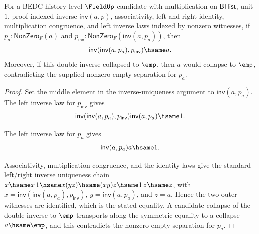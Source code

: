 \begin{theorem}
\label{thm:field-inverse-involutive-nonzero-from-apartness}
For a BEDC history-level $\FieldUp$ candidate with multiplication on
$\mathsf{BHist}$, unit $1$, proof-indexed inverse $\mathsf{inv}(a,p)$,
associativity, left and right identity, multiplication congruence, and left
inverse laws indexed by nonzero witnesses, if
$p_a:\mathsf{NonZero}_F(a)$ and
$p_{\mathsf{inv}}:\mathsf{NonZero}_F(\mathsf{inv}(a,p_a))$, then
$$
\mathsf{inv}(\mathsf{inv}(a,p_a),p_{\mathsf{inv}})\hsame a.
$$
Moreover, if this double inverse collapsed to $\emp$, then $a$ would collapse
to $\emp$, contradicting the supplied nonzero-empty separation for $p_a$.
\end{theorem}
\begin{proof}
Set the middle element in the inverse-uniqueness argument to
$\mathsf{inv}(a,p_a)$. The left inverse law for $p_{\mathsf{inv}}$ gives
$$
\mathsf{inv}(\mathsf{inv}(a,p_a),p_{\mathsf{inv}})\mathsf{inv}(a,p_a)\hsame 1.
$$

The left inverse law for $p_a$ gives
$$
\mathsf{inv}(a,p_a)a\hsame 1.
$$

Associativity, multiplication congruence, and the identity laws give the
standard left/right inverse uniqueness chain
$x\hsame x\,1\hsame x(yz)\hsame (xy)z\hsame 1\,z\hsame z$, with
$x=\mathsf{inv}(\mathsf{inv}(a,p_a),p_{\mathsf{inv}})$,
$y=\mathsf{inv}(a,p_a)$, and $z=a$. Hence the two outer witnesses are
identified, which is the stated equality. A candidate collapse of the double
inverse to $\emp$ transports along the symmetric equality to a collapse
$a\hsame\emp$, and this contradicts the nonzero-empty separation for $p_a$.
\end{proof}


